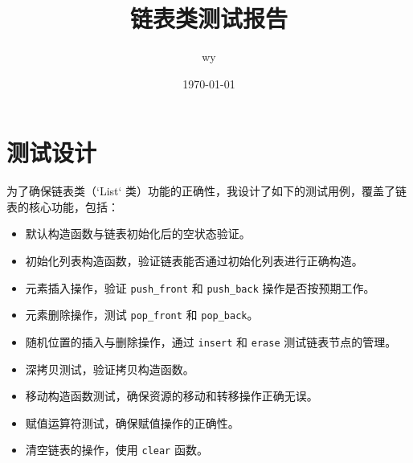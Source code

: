 \documentclass[UTF8]{ctexart}
\title{链表类测试报告}
\author{wy}
\date{\today}
\begin{document}
\maketitle

\section{测试设计}
为了确保链表类（`List` 类）功能的正确性，我设计了如下的测试用例，覆盖了链表的核心功能，包括：
\begin{itemize}
    \item 默认构造函数与链表初始化后的空状态验证。
    \item 初始化列表构造函数，验证链表能否通过初始化列表进行正确构造。
    \item 元素插入操作，验证 \texttt{push\_front} 和 \texttt{push\_back} 操作是否按预期工作。
    \item 元素删除操作，测试 \texttt{pop\_front} 和 \texttt{pop\_back}。
    \item 随机位置的插入与删除操作，通过 \texttt{insert} 和 \texttt{erase} 测试链表节点的管理。
    \item 深拷贝测试，验证拷贝构造函数。
    \item 移动构造函数测试，确保资源的移动和转移操作正确无误。
    \item 赋值运算符测试，确保赋值操作的正确性。
    \item 清空链表的操作，使用 \texttt{clear} 函数。
\end{itemize}
\end{document}
